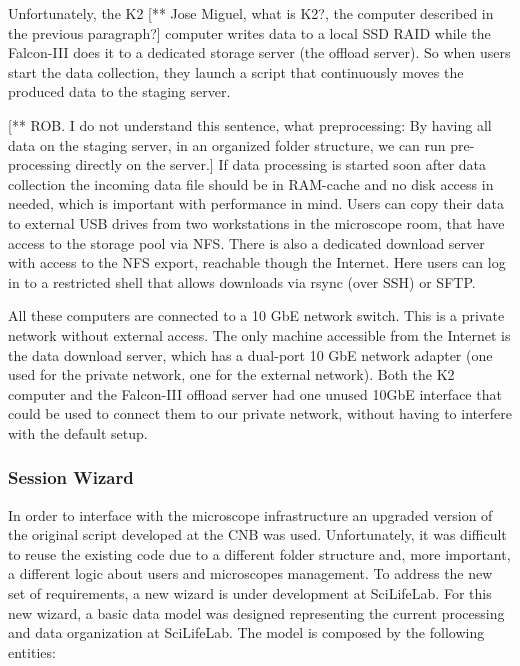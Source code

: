 Unfortunately, the K2 [** Jose Miguel, what is K2?, the computer described in the previous paragraph?] computer writes data to a local SSD RAID while the Falcon-III does it to a dedicated storage server (the offload server). %
So when users start the data collection, they launch a script that continuously moves the produced data to the staging server.

[** ROB. I do not understand this sentence, what preprocessing:  By having all data on the staging server, in an organized folder structure, we
can run pre-processing directly on the server.] If data processing is started soon
after data collection the incoming data file should be in RAM-cache and  no
disk access in needed, which is important with performance in mind. Users
can copy their data to external USB drives from two workstations in the
microscope room, that have access to the storage pool via NFS.
There is also a dedicated download server with access to the NFS export,
reachable though the Internet. Here users can log in to a restricted shell that
allows downloads via rsync (over SSH) or SFTP. 

All these computers are connected to a 10 GbE network switch. This is a private
network without external access. The only machine accessible from the Internet
is the data download server, which has a dual-port 10 GbE network adapter (one
used for the private network, one for the external network). Both the K2
computer and the Falcon-III offload server had one unused 10GbE interface that
could be used to connect them to our private network, without having to
interfere with the default setup.

\subsubsection{Session Wizard}
In order to interface \scipion with the microscope infrastructure an upgraded version of the original script developed at the CNB was used. Unfortunately, it was difficult to reuse the existing code due to a different folder structure and, more important, a different logic about users and microscopes management. To address the new set of requirements, a new wizard is under development at SciLifeLab. For this new wizard, a basic data model was designed representing the current processing and data organization at SciLifeLab. The model is composed by the following entities:

